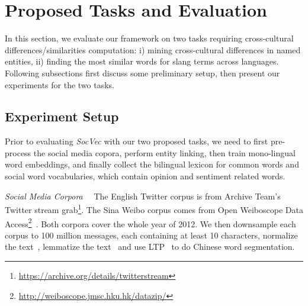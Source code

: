 \section{Proposed Tasks and Evaluation}
\label{sec:eval}
In this section, we evaluate our framework on two tasks requiring cross-cultural differences/similarities computation: i) mining cross-cultural differences in named
entities, ii) finding the most similar words for slang terms across languages. Following subsections first discuss some
preliminary setup, then present our experiments for the two tasks.

\subsection{Experiment Setup}
\label{sec:prelim}
Prior to evaluating \textit{SocVec} with our two proposed tasks, we need to first pre-process the social media copora, perform entity linking, then train mono-lingual word embeddings, and finally collect the bilingual lexicon for common words and
social word vocabularies, which contain opinion and sentiment related words. 

\textit{Social Media Corpora}~~
The English Twitter corpus is from Archive Team's Twitter stream 
grab\footnote{{\url{https://archive.org/details/twitterstream}}}.
The Sina Weibo corpus comes from Open Weiboscope 
Data Access\footnote{{\url{http://weiboscope.jmsc.hku.hk/datazip/}}}~\cite{fu2013assessing}.
Both corpora cover the whole year of 2012. 
We then downsample each corpus to 100 million messages, each 
containing at least 10 characters, normalize the text~\cite{han2012automatically}, lemmatize the text~\cite{manning2014stanford} and use 
LTP~\cite{che2010ltp} to do Chinese word segmentation.

